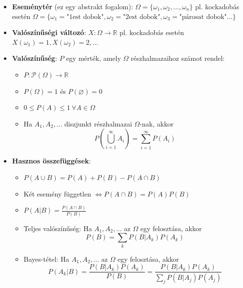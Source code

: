 \documentclass[12pt]{article}
\theoremstyle{plain}
\begin{document}
\begin{itemize}
    \item \textbf{Eseménytér} (ez egy abstrakt fogalom): $\Omega = \{\omega_1, \omega_2, ..., \omega_n\}$ pl. kockadobás esetén $\Omega = \{ \omega_1=\text{"1est dobok"}, \omega_2=\text{"2est dobok"}, \omega_3=\text{"párosat dobok"} ... \}$
    \item \textbf{Valószínűségi változó}: $X:\Omega \rightarrow \mathbb R$ pl. kockadobás esetén $X(\omega_1) = 1, X(\omega_2) = 2, ... $
    \item \textbf{Valószínűség}: $P$ egy mérték, amely $\Omega$ részhalmazaihoz számot rendel:
        \begin{itemize}
            \item $P: \mathcal{P}(\Omega) \rightarrow \mathbb R$
            \item $P(\Omega) = 1$ és $P(\varnothing) = 0$
            \item $ 0 \leq P(A) \leq 1 ~ \forall A \in \Omega$
            \item Ha $A_1, A_2, ...$ diszjunkt részhalmazai $\Omega$-nak, akkor 
            \begin{equation*}
                P\left(\bigcup\limits_{i=1}^{\infty}A_i\right) = \sum\limits_{i=1}^{\infty}P(A_i)
            \end{equation*}
        \end{itemize}
    \item \textbf{Hasznos összefüggések}:
        \begin{itemize}
            \item $P(A\cup B) = P(A)+P(B)-P(A\cap B)$
            \item Két esemény független $\Longleftrightarrow P(A\cap B) = P(A)P(B)$
            \item $P(A|B) = \frac{P(A\cap B)}{P(B)}$
            \item Teljes valószínűség: Ha $A_1, A_2, ...$ az $\Omega$ egy felosztása, akkor 
                \begin{equation*}
                    P(B) = \sum\limits_{k} P(B|A_k)P(A_k)
                \end{equation*}
            \item Bayes-tétel: Ha $A_1, A_2, ...$ az $\Omega$ egy felosztása, akkor 
                \begin{equation*}
                    P(A_k|B) = \frac{P(B|A_k)P(A_k)}{P(B)} = \frac{P(B|A_k)P(A_k)}{\sum\limits_{j} P(B|A_j)P(A_j)}
                \end{equation*}

\end{itemize}
\end{itemize}
\end{document}
